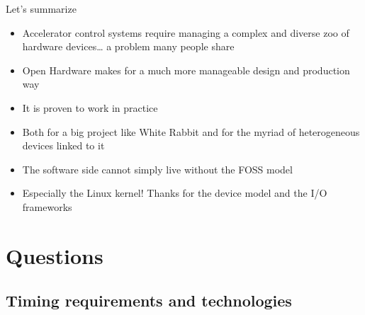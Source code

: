 \documentclass[compress,red]{beamer}
\begin{document}
\begin{frame}{Let's summarize}

\begin{itemize}
\pause \item Accelerator control systems require managing a complex and
    diverse zoo of hardware devices\ldots \pause  
    a problem many people share
\pause \item Open Hardware makes for a much more manageable design and 
    production way
\pause \item It is proven to work in practice
\pause \item Both for a big project like White Rabbit and for the myriad
    of heterogeneous devices linked to it
\pause \item The software side cannot simply live without the FOSS
    model
\pause \item Especially the Linux kernel! Thanks for the device model and
    the I/O frameworks
\end{itemize}
\end{frame}

\section{Questions}

\subsection {Timing requirements and technologies}

\end{document}

